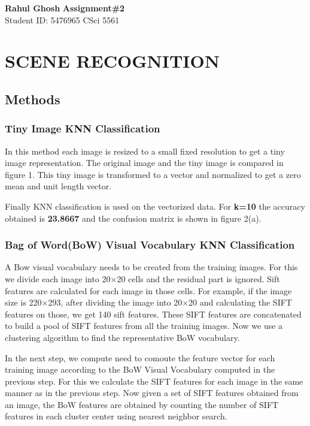 \documentclass[letter, 11pt]{article}
\begin{document}
\noindent
\large \textbf{Rahul Ghosh} \hfill \textbf{Assignment\#2}\\
\normalsize Student ID: 5476965 \hfill CSci 5561\\

\section*{SCENE RECOGNITION}
\subsection*{Methods}
\subsubsection*{Tiny Image KNN Classification}
In this method each image is resized to a small fixed resolution to get a tiny image representation. The original image and the tiny image is compared in figure 1. This tiny image is transformed to a vector and normalized to get a zero mean and unit length vector. 

Finally KNN classification is used on the vectorized data. For \textbf{k=10} the accuracy obtained is \textbf{23.8667} and the confusion matrix is shown in figure 2(a).

\subsubsection*{Bag of Word(BoW) Visual Vocabulary KNN Classification}
A Bow visual vocabulary needs to be created from the training images. For this we divide each image into 20$\times$20 cells and the residual part is ignored. Sift features are calculated for each image in those cells.  For example, if the image size is 220$\times$293, after dividing the image into 20$\times$20 and calculating the SIFT features on those, we get 140 sift features. These SIFT features are concatenated to build a pool of SIFT features from all the training images. Now we use a clustering algorithm to find the representative BoW vocabulary.

In the next step, we compute need to comoute the feature vector for each training image according to the  BoW Visual Vocabulary computed in the previous step. For this we calculate the SIFT features for each image in the same manner as in the previous step. Now given a set of SIFT features obtained from an image, the BoW features are obtained by
counting the number of SIFT features in each cluster center using nearest neighbor search.
\end{document}
